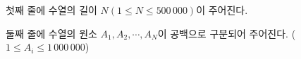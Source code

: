 첫째 줄에 수열의 길이 $N(1 \leq N \leq 500\,000)$이 주어진다.

둘째 줄에 수열의 원소 $A_1, A_2, \cdots, A_N$이 공백으로 구분되어 주어진다. ($1 \le A_i \le 1\,000\,000$)